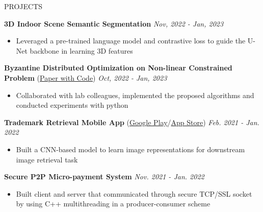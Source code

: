 \documentclass{resume} %
\begin{document}
\begin{rSection}{PROJECTS}
\vspace{-1.25em}


\item {\bf 3D Indoor Scene Semantic Segmentation} \hfill \textit{Nov, 2022 -  Jan, 2023}
\begin{itemize}
    \item Leveraged a pre-trained language model and contrastive loss to guide the U-Net backbone in learning 3D features
\end{itemize}

\item {\bf Byzantine Distributed Optimization on Non-linear Constrained Problem} (\href{https://github.com/slimon110/2022_Fault_Tolerance/blob/master/FT-Report/FT-Report.pdf}{Paper with Code})  \hfill \textit{Oct, 2022 - Jan, 2023}
\begin{itemize}
    \itemsep -3pt
    \item Collaborated with lab colleagues, implemented the proposed algorithms and conducted experiments with python
\end{itemize}

\item \textbf{Trademark Retrieval Mobile App} (\href{https://play.google.com/store/apps/details?id=meow.logoshot&hl=zh_TW&gl=TW&pli=1}{Google Play}/\href{https://apps.apple.com/tw/app/logo-shot/id1611756574}{App Store}) \hfill \textit{Feb. 2021 - Jan. 2022}
\begin{itemize}
    \itemsep -3pt
    \item  Built a CNN-based model to learn image representations for downstream image retrieval task 
\end{itemize}

\item \textbf{Secure P2P Micro-payment System} \hfill \textit{Nov. 2021 - Jan. 2022} 
\begin{itemize}
    \itemsep -3pt
    \item Built client and server that communicated through secure TCP/SSL socket by using C++ multithreading in a producer-consumer scheme
\end{itemize}


\end{rSection}
\end{document}

